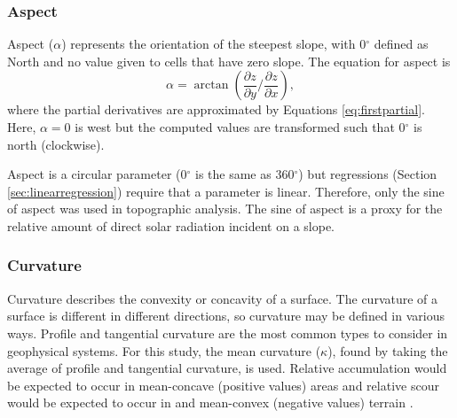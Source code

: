 \documentclass{sfuthesis}
\begin{document}
{\subsubsection*{Aspect} 

Aspect ($\alpha$) represents the orientation of the steepest slope, with 0${^\circ}$ defined as North and no value given to cells that have zero slope. The equation for aspect is \citep{Neteler2008}
	\begin{equation}
	\alpha = \arctan\left(\frac{\partial z}{\partial y} \bigg/ \frac{\partial z}{\partial x}\right), 
	\end{equation}
where the partial derivatives are approximated by Equations \ref{eq:firstpartial}. Here, $\alpha = 0$ is west but the computed values are transformed such that 0${^\circ}$ is north (clockwise). 

Aspect is a circular parameter (0${^\circ}$ is the same as 360${^\circ}$) but regressions (Section \ref{sec:linearregression}) require that a parameter is linear. Therefore, only the sine of aspect was used in topographic analysis. The sine of aspect is a proxy for the relative amount of direct solar radiation incident on a slope.


\subsubsection*{Curvature} 

Curvature describes the convexity or concavity of a surface. The curvature of a surface is different in different directions, so curvature may be defined in various ways. Profile and tangential curvature are the most common types to consider in geophysical systems. For this study, the mean curvature ($\kappa$), found by taking the average of profile and tangential curvature, is used. Relative accumulation would be expected to occur in mean-concave (positive values) areas and relative scour would be expected to occur in and mean-convex (negative values) terrain \citep{Olaya2009}.

}
\end{document}

